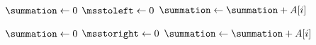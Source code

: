 
\begin{algorithm}[H]
  \begin{algorithmic}[1]
      \hStatex
      \State $\summation \gets 0$
      \State $\msstoleft \gets 0$
        
        \State $\summation \gets \summation + A[i]$
        \State \blue{$\msstoleft \gets \max \set{\msstoleft, \summation}$}
      \EndFor

      \hStatex
      \State $\summation \gets 0$
      \State $\msstoright \gets 0$
        
        \State $\summation \gets \summation + A[i]$
        \State \blue{$\msstoright \gets \max \set{\msstoright, \summation}$}
      \EndFor

      \hStatex
      \State \red{$\middlemss \gets \msstoleft + \msstoright$}

      \State
      \State \purple{\Return $\max \set{\leftmss, \rightmss, \middlemss}$}
    \EndProcedure
  \end{algorithmic}
\end{algorithm}